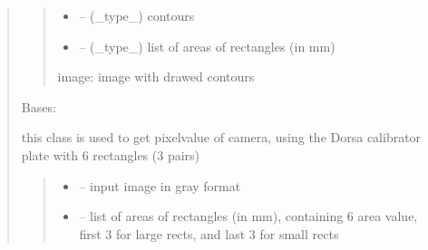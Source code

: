 \documentclass[letterpaper,10pt,english]{sphinxmanual}
\begin{document}
\begin{quote}
\begin{savenotes}
\begin{fulllineitems}
\begin{quote}
\begin{description}
\begin{itemize}
\item {} 
\sphinxAtStartPar
{} – (\_type\_) contours

\item {} 
\sphinxAtStartPar
{} – (\_type\_) list of areas of rectangles (in mm)

\end{itemize}

\sphinxAtStartPar
image: image with drawed contours

\end{description}\end{quote}

\end{fulllineitems}\end{savenotes}


\begin{savenotes}\begin{fulllineitems}
\label{\detokenize{setting/backend/pxvalue_calibration:oxin.backend.pxvalue_calibration.extract_info}}
\pysigstartsignatures
{}
\pysigstopsignatures
\sphinxAtStartPar
Bases: 

\sphinxAtStartPar
this class is used to get pixel\sphinxhyphen{}value of camera, using the Dorsa calibrator plate with 6 rectangles (3 pairs)
\begin{quote}\begin{description}
\begin{itemize}
\item {} 
\sphinxAtStartPar
{} – input image in gray format

\item {} 
\sphinxAtStartPar
{} – list of areas of rectangles (in mm), containing 6 area value, first 3 for large rects, and last 3 for small rects


\end{itemize}
\end{description}
\end{quote}
\end{fulllineitems}
\end{savenotes}
\end{quote}
\end{document}
